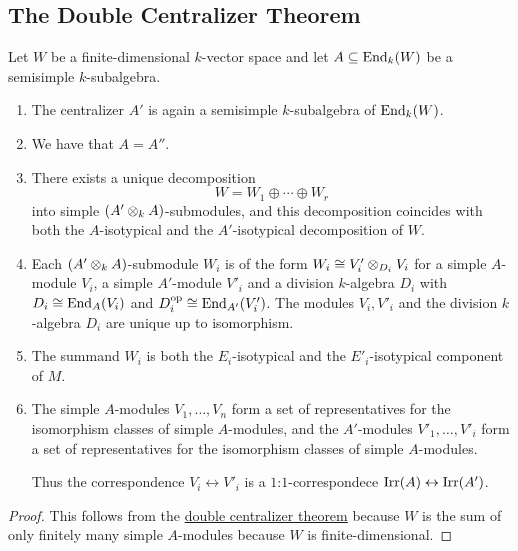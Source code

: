 




\subsection*{The Double Centralizer Theorem}


\begin{corollary}
  \label{corollary: special double centralizer theorem}
  Let $W$ be a finite-dimensional $k$-vector space and let $A \subseteq \operatorname{End}_k(W)$ be a semisimple $k$-subalgebra.
  \begin{enumerate}
    \item
      The centralizer $A'$ is again a semisimple $k$-subalgebra of $\operatorname{End}_k(W)$.
    \item
      We have that $A = A''$.
    \item
      There exists a unique decomposition
      \[
        W = W_1 \oplus \dotsb \oplus W_r
      \]
      into simple $(A' \mathbin{\otimes}_k A)$-submodules, and this decomposition coincides with both the $A$-isotypical and the $A'$-isotypical decomposition of $W$.
    \item
      Each $(A' \mathbin{\otimes}_k A)$-submodule $W_i$ is of the form $W_i \cong V'_i \mathbin{\otimes}_{D_i} V_i$ for a simple $A$-module $V_i$, a simple $A'$-module $V'_i$ and a division $k$-algebra $D_i$ with $D_i \cong \operatorname{End}_A(V_i)$ and $D_i^{\operatorname{op}} \cong \operatorname{End}_{A'}(V'_i)$.
      The modules $V_i, V'_i$ and the division $k$-algebra $D_i$ are unique up to isomorphism.
    \item
      The summand $W_i$ is both the $E_i$-isotypical and the $E'_i$-isotypical component of $M$.
    \item
      The simple $A$-modules $V_1, \dotsc, V_n$ form a set of representatives for the isomorphism classes of simple $A$-modules, and the $A'$-modules $V'_1, \dotsc, V'_i$ form a set of representatives for the isomorphism classes of simple $A$-modules.
      
      Thus the correspondence $V_i \leftrightarrow V'_i$ is a $1$:$1$-correspondece $\operatorname{Irr}(A) \leftrightarrow \operatorname{Irr}(A')$.
  \end{enumerate}
\end{corollary}


\begin{proof}
  This follows from the \hyperref[theorem: general double centralizer theorem]{double centralizer theorem} because $W$ is the sum of only finitely many simple $A$-modules because $W$ is finite-dimensional.
\end{proof}



